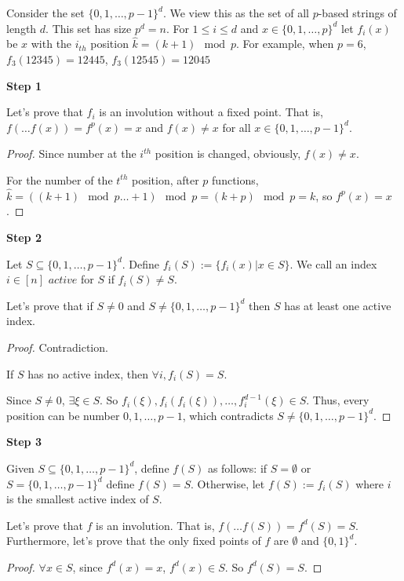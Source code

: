 \begin{solution}

Consider the set $\{0,1, \dots, p-1\}^d$. We view this as the set of all $p$-based strings of length $d$. This set has size $p^d = n$. For $1 \leq i \leq d$ and $x \in \{0,1, \dots, p \}^d$ let $f_i(x)$ be $x$ with the $i_{th}$ position $\hat k = (k + 1) \mod p$. For example, when $p = 6 $, $f_3(12345) = 12445$, $f_3(12545)=12045$

\textbf{Step 1} 

Let's prove that $f_i$ is an involution without a fixed point. That is, $f(\dots f(x)) = f^p(x) = x$ and $f(x) \neq x$ for all $x \in \{0,1, \dots, p-1 \}^d$.

\begin{proof}
Since number at the $i^{th}$ position is changed, obviously, $f(x) \neq x$.

For the number of the $t^{th}$ position, after $p$ functions, $\hat k = ((k+1) \mod p \dots + 1) \mod p = (k + p) \mod p = k$, so $f^p(x) = x$.
\end{proof}

\textbf{Step 2} 

Let $S \subseteq \{0,1, \dots, p-1 \}^d$. Define $f_i(S) := \{ f_i(x) | x \in S\}$. We call an index $i \in [n]$ $active$ for $S$ if $f_i(S) \neq S$.

Let's prove that if $S \neq 0$ and $S \neq \{0,1, \dots, p-1 \}^d$ then $S$ has at least one active index.

\begin{proof}
Contradiction.

If $S$ has no active index, then $\forall i, f_i(S) = S$.

Since $S \neq 0$, $\exists \xi \in S$. So $f_i(\xi), f_i(f_i(\xi)), \dots, f^{d-1}_i(\xi) \in S$. Thus, every position can be number $0, 1, \dots, p-1$, which contradicts $S \neq \{0, 1, \dots, p-1\}^d$.
\end{proof}

\textbf{Step 3}

Given $S \subseteq \{0,1, \dots, p-1\}^d$, define $f(S)$ as follows: if $S = \emptyset$ or $S = \{0,1, \dots, p-1\}^d$ define $f(S) = S$. Otherwise, let $f(S) := f_i(S)$ where $i$ is the smallest active index of $S$.

Let's prove that $f$ is an involution. That is, $f(\dots f(S)) = f^d(S) = S$. Furthermore, let's prove that the only fixed points of $f$ are $\emptyset$ and $\{0,1\}^d$.

\begin{proof}
$\forall x \in S$, since $f^d(x) = x$, $f^d(x) \in S$. So $f^d(S) = S$.


\end{proof}
\end{solution}
